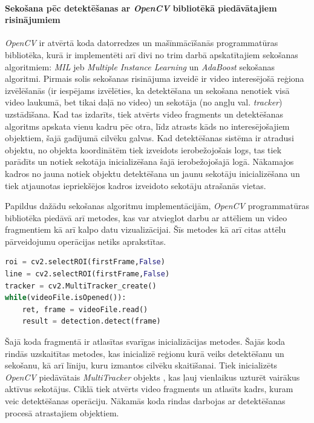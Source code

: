 \paragraph{Sekošana pēc detektēšanas ar \textit{OpenCV} bibliotēkā piedāvātajiem risinājumiem} 
\hfill\par
\textit{OpenCV} ir atvērtā koda datorredzes un mašīnmācīšanās programmatūras bibliotēka, kurā ir implementēti arī divi no trim darbā apskatītajiem sekošanas algoritmiem: \textit{MIL} jeb \textit{Multiple Instance Learning} un \textit{AdaBoost} sekošanas algoritmi. Pirmais solis sekošanas risinājuma izveidē ir video interesējošā reģiona izvēlēšanās (ir iespējams izvēlēties, ka detektēšana un sekošana nenotiek visā video laukumā, bet tikai daļā no video) un sekotāja (no angļu val. \textit{tracker}) uzstādīšana. Kad tas izdarīts, tiek atvērts video fragments un detektēšanas algoritms apskata vienu kadru pēc otra, līdz atrasts kāds no interesējošajiem objektiem, šajā gadījumā cilvēku galvas. Kad detektēšanas sistēma ir atradusi objektu, no objekta koordinātēm tiek izveidots ierobežojošais logs, tas tiek parādīts un notiek sekotāja inicializēšana šajā ierobežojošajā logā. Nākamajos kadros no jauna notiek objektu detektēšana un jaunu sekotāju inicializēšana un tiek atjaunotas iepriekšējos kadros izveidoto sekotāju atrašanās vietas.  

Papildus dažādu sekošanas algoritmu implementācijām, \textit{OpenCV} programmatūras bibliotēka piedāvā arī metodes, kas var atvieglot darbu ar attēliem un video fragmentiem kā arī kalpo datu vizualizācijai. Šīs metodes kā arī citas attēlu pārveidojumu operācijas netiks aprakstītas.

\begin{lstlisting}[language=Python]
roi = cv2.selectROI(firstFrame,False)
line = cv2.selectROI(firstFrame,False)
tracker = cv2.MultiTracker_create()   
while(videoFile.isOpened()):  
	ret, frame = videoFile.read()     
	result = detection.detect(frame)    
\end{lstlisting}
Šajā koda fragmentā ir atlasītas svarīgas inicializācijas metodes. Šajās koda rindās uzskaitītas metodes, kas inicializē reģionu kurā veiks detektēšanu un sekošanu, kā arī līniju, kuru izmantos cilvēku skaitīšanai. Tiek inicializēts \textit{OpenCV} piedāvātais \textit{MultiTracker} objekts \cite{multitrack}, kas ļauj vienlaikus uzturēt vairākus aktīvus sekotājus. Ciklā tiek atvērts video fragments un atlasīts kadrs, kuram veic detektēšanas operāciju. Nākamās koda rindas darbojas ar detektēšanas procesā atrastajiem objektiem.

